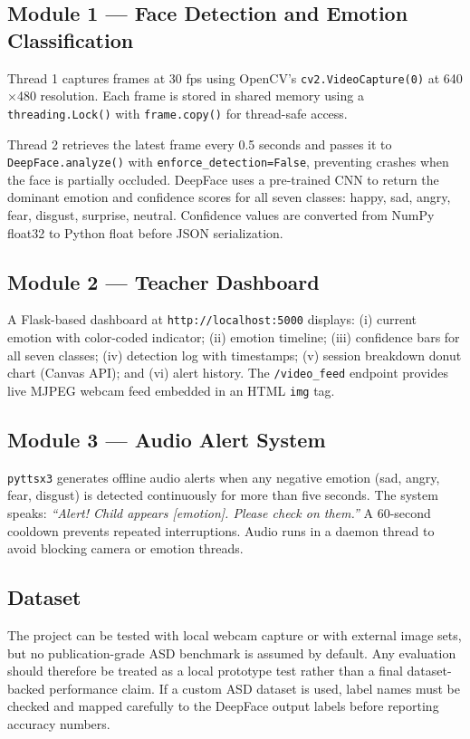 \documentclass[conference]{IEEEtran}
\begin{document}
\subsection{Module 1 --- Face Detection and Emotion Classification}

Thread 1 captures frames at 30 fps using OpenCV's
\texttt{cv2.VideoCapture(0)} at 640$\times$480 resolution.
Each frame is stored in shared memory using a
\texttt{threading.Lock()} with \texttt{frame.copy()} for
thread-safe access.

Thread 2 retrieves the latest frame every 0.5 seconds and
passes it to \texttt{DeepFace.analyze()} with
\texttt{enforce\_detection=False}, preventing crashes when
the face is partially occluded. DeepFace uses a pre-trained
CNN to return the dominant emotion and confidence scores for
all seven classes: happy, sad, angry, fear, disgust,
surprise, neutral. Confidence values are converted from
NumPy float32 to Python float before JSON serialization.

\subsection{Module 2 --- Teacher Dashboard}

A Flask-based dashboard at \texttt{http://localhost:5000}
displays: (i) current emotion with color-coded indicator;
(ii) emotion timeline; (iii) confidence bars for all seven
classes; (iv) detection log with timestamps; (v) session
breakdown donut chart (Canvas API); and (vi) alert history.
The \texttt{/video\_feed} endpoint provides live MJPEG
webcam feed embedded in an HTML \texttt{img} tag.

\subsection{Module 3 --- Audio Alert System}

\texttt{pyttsx3} generates offline audio alerts when any
negative emotion (sad, angry, fear, disgust) is detected
continuously for more than five seconds. The system speaks:
\textit{``Alert! Child appears [emotion]. Please check on
them.''} A 60-second cooldown prevents repeated
interruptions. Audio runs in a daemon thread to avoid
blocking camera or emotion threads.

\subsection{Dataset}

The project can be tested with local webcam capture or with
external image sets, but no publication-grade ASD benchmark is
assumed by default. Any evaluation should therefore be treated
as a local prototype test rather than a final dataset-backed
performance claim. If a custom ASD dataset is used, label names
must be checked and mapped carefully to the DeepFace output
labels before reporting accuracy numbers.
\end{document}
